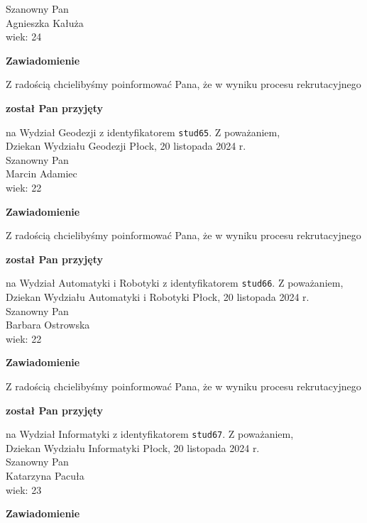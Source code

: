 \documentclass[12pt,a4paper]{article}
\begin{document}
\noindent 
Szanowny Pan \\
Agnieszka Kałuża \\
wiek: 24
\bigskip
\begin{center}
 	{\Large\textbf{Zawiadomienie}}
\end{center}
\bigskip
Z radością chcielibyśmy poinformować Pana, że w wyniku procesu rekrutacyjnego 
\begin{center}
\textsf{\textbf{został Pan przyjęty}} 
\end{center}
na Wydział Geodezji z identyfikatorem \verb|stud65|. 
\vspace{2cm}
\noindent
Z poważaniem,\\
Dziekan
Wydziału Geodezji
\newpage
\hfill Płock, 20 listopada 2024 r.\\
\noindent 
Szanowny Pan \\
Marcin Adamiec \\
wiek: 22
\bigskip
\begin{center}
 	{\Large\textbf{Zawiadomienie}}
\end{center}
\bigskip
Z radością chcielibyśmy poinformować Pana, że w wyniku procesu rekrutacyjnego 
\begin{center}
\textsf{\textbf{został Pan przyjęty}} 
\end{center}
na Wydział Automatyki i Robotyki z identyfikatorem \verb|stud66|. 
\vspace{2cm}
\noindent
Z poważaniem,\\
Dziekan
Wydziału Automatyki i Robotyki
\newpage
\hfill Płock, 20 listopada 2024 r.\\
\noindent 
Szanowny Pan \\
Barbara Ostrowska \\
wiek: 22
\bigskip
\begin{center}
 	{\Large\textbf{Zawiadomienie}}
\end{center}
\bigskip
Z radością chcielibyśmy poinformować Pana, że w wyniku procesu rekrutacyjnego 
\begin{center}
\textsf{\textbf{został Pan przyjęty}} 
\end{center}
na Wydział Informatyki z identyfikatorem \verb|stud67|. 
\vspace{2cm}
\noindent
Z poważaniem,\\
Dziekan
Wydziału Informatyki
\newpage
\hfill Płock, 20 listopada 2024 r.\\
\noindent 
Szanowny Pan \\
Katarzyna Pacuła \\
wiek: 23
\bigskip
\begin{center}
 	{\Large\textbf{Zawiadomienie}}
\end{center}
\end{document}
